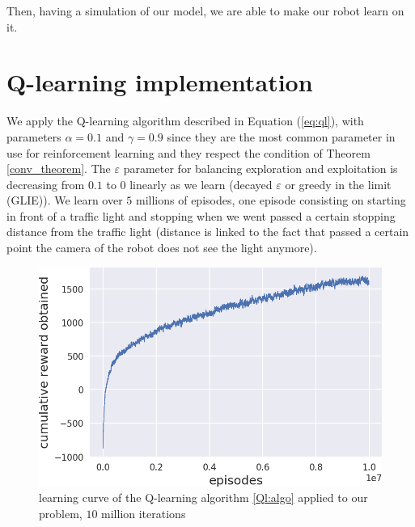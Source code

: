 \documentclass[14pt,a4paper]{article}
\theoremstyle{definition}
\begin{document}
Then, having a simulation of our model, we are able to make our robot learn on it.



\section{Q-learning implementation}


We apply the Q-learning algorithm described in Equation (\ref{eq:ql}), with parameters $\alpha = 0.1$ and $\gamma = 0.9$ since they are the most common parameter in use for reinforcement learning and they respect the condition of Theorem \ref{conv_theorem}. The $\varepsilon$ parameter for balancing exploration and exploitation is decreasing from $0.1$ to $0$ linearly as we learn (decayed $\varepsilon$ or greedy in the limit (GLIE)). We learn over $5$ millions of episodes, one episode consisting on starting in front of a traffic light and stopping when we went passed a certain stopping distance from the traffic light (distance is linked to the fact that passed a certain point the camera of the robot does not see the light anymore).


\begin{figure}[h]
\centering
\captionsetup{justification=centering,margin=2cm}
\includegraphics[scale=0.6]{img/Q_learning_10m.png}
\caption{learning curve of the Q-learning algorithm \ref{Ql:algo} applied to our problem, $10$ million iterations}
\label{curve}
\end{figure}
\end{document}

